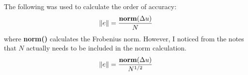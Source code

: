 The following was used to calculate the order of accuracy:
\begin{equation*}
\Vert e \Vert = \dfrac{\text{\bf norm}(\Delta u)}{N}
\end{equation*}
where \textbf{norm()} calculates the Frobenius norm. However, I noticed from the notes that $N$ actually needs to be included in the norm calculation.
\begin{equation*}
\Vert e \Vert = \dfrac{\text{\bf norm}(\Delta u)}{N^{1/2}}
\end{equation*}

